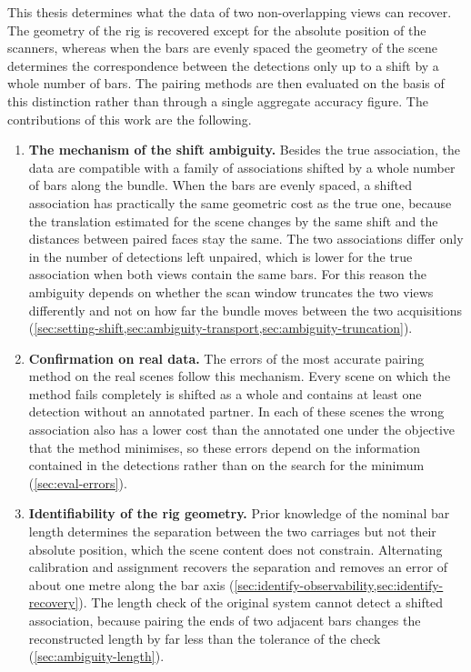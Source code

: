 \documentclass[a4paper, 12pt, twoside]{book}
\begin{document}
This thesis determines what the data of two non-overlapping views can recover. The geometry of the rig is recovered except for the absolute position of the scanners, whereas when the bars are evenly spaced the geometry of the scene determines the correspondence between the detections only up to a shift by a whole number of bars. The pairing methods are then evaluated on the basis of this distinction rather than through a single aggregate accuracy figure. The contributions of this work are the following.

\begin{enumerate}

\item \textbf{The mechanism of the shift ambiguity.} Besides the true association, the data are compatible with a family of associations shifted by a whole number of bars along the bundle. When the bars are evenly spaced, a shifted association has practically the same geometric cost as the true one, because the translation estimated for the scene changes by the same shift and the distances between paired faces stay the same. The two associations differ only in the number of detections left unpaired, which is lower for the true association when both views contain the same bars. For this reason the ambiguity depends on whether the scan window truncates the two views differently and not on how far the bundle moves between the two acquisitions (\cref{sec:setting-shift,sec:ambiguity-transport,sec:ambiguity-truncation}).

\item \textbf{Confirmation on real data.} The errors of the most accurate pairing method on the real scenes follow this mechanism. Every scene on which the method fails completely is shifted as a whole and contains at least one detection without an annotated partner. In each of these scenes the wrong association also has a lower cost than the annotated one under the objective that the method minimises, so these errors depend on the information contained in the detections rather than on the search for the minimum (\cref{sec:eval-errors}).

\item \textbf{Identifiability of the rig geometry.} Prior knowledge of the nominal bar length determines the separation between the two carriages but not their absolute position, which the scene content does not constrain. Alternating calibration and assignment recovers the separation and removes an error of about one metre along the bar axis (\cref{sec:identify-observability,sec:identify-recovery}). The length check of the original system cannot detect a shifted association, because pairing the ends of two adjacent bars changes the reconstructed length by far less than the tolerance of the check (\cref{sec:ambiguity-length}).


\end{enumerate}
\end{document}
